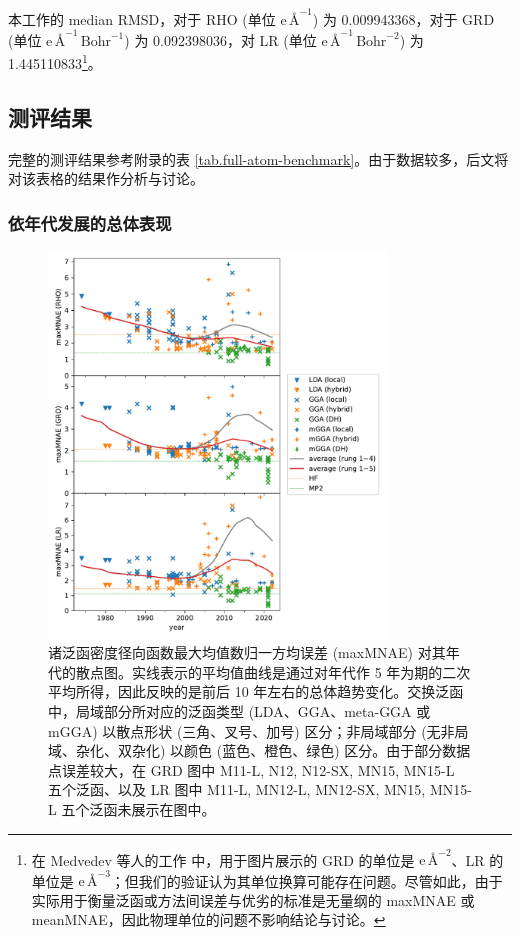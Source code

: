 本工作的 median RMSD，对于 RHO (单位 $\text{e} \, \text{\AA}^{-1}$) 为 0.009943368，对于 GRD (单位 $\text{e} \, \text{\AA}^{-1} \, \text{Bohr}^{-1}$) 为 0.092398036，对 LR (单位 $\text{e} \, \text{\AA}^{-1} \, \text{Bohr}^{-2}$) 为 1.445110833\footnote{在 Medvedev 等人的工作\cite{Medvedev-Lyssenko.S.2017} 中，用于图片展示的 GRD 的单位是 $\text{e} \, \text{\AA}^{-2}$、LR 的单位是 $\text{e} \, \text{\AA}^{-3}$；但我们的验证认为其单位换算可能存在问题。尽管如此，由于实际用于衡量泛函或方法间误差与优劣的标准是无量纲的 maxMNAE 或 meanMNAE，因此物理单位的问题不影响结论与讨论。}。

\subsection{测评结果}

完整的测评结果参考附录的表 \ref{tab.full-atom-benchmark}。由于数据较多，后文将对该表格的结果作分析与讨论。

\subsubsection{依年代发展的总体表现}

\begin{figure}[tp]
    \centering
    \caption{诸泛函密度径向函数最大均值数归一方均误差 (maxMNAE) 对其年代的散点图。实线表示的平均值曲线是通过对年代作 5 年为期的二次平均所得，因此反映的是前后 10 年左右的总体趋势变化。交换泛函中，局域部分所对应的泛函类型 (LDA、GGA、meta-GGA 或 mGGA) 以散点形状 (三角、叉号、加号) 区分；非局域部分 (无非局域、杂化、双杂化) 以颜色 (蓝色、橙色、绿色) 区分。由于部分数据点误差较大，在 GRD 图中 M11-L, N12, N12-SX, MN15, MN15-L 五个泛函、以及 LR 图中 M11-L, MN12-L, MN12-SX, MN15, MN15-L 五个泛函未展示在图中。}
    \label{fig.maxMNAE-against-year}
    \includegraphics[width=0.8\textwidth]{assets/maxMNAE-against-year.pdf}
\end{figure}

